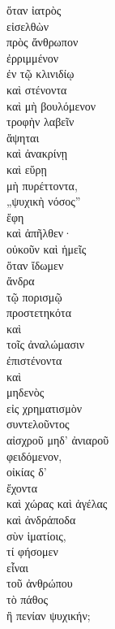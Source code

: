 {\large
\begin{greek}
\noindent  ὅταν ἰατρὸς \\
\tabto{2em} εἰσελθὼν \\
\tabto{4em} πρὸς ἄνθρωπον \\
\tabto{6em} ἐρριμμένον \\
\tabto{8em} ἐν τῷ κλινιδίῳ \\
\tabto{6em} καὶ στένοντα \\
\tabto{6em} καὶ μὴ βουλόμενον \\
\tabto{8em} τροφὴν λαβεῖν \\
ἅψηται \\
καὶ ἀνακρίνῃ \\
καὶ εὕρῃ \\
\tabto{2em} μὴ πυρέττοντα,\\
„ψυχικὴ νόσος”\\
\tabto{2em} ἔφη \\
καὶ ἀπῆλθεν·\\
οὐκοῦν καὶ ἡμεῖς \\
\tabto{2em} ὅταν ἴδωμεν \\
\tabto{4em} ἄνδρα \\
\tabto{6em} τῷ πορισμῷ \\
\tabto{4em} προστετηκότα \\
\tabto{4em} καὶ \\
\tabto{6em} τοῖς ἀναλώμασιν \\
\tabto{4em} ἐπιστένοντα \\

\tabto{4em} καὶ \\
\tabto{6em} μηδενὸς \\
\tabto{8em} εἰς χρηματισμὸν \\
\tabto{6em} συντελοῦντος \\
\tabto{6em} αἰσχροῦ μηδ' ἀνιαροῦ \\
\tabto{4em} φειδόμενον, \\
\tabto{4em} οἰκίας δ' \\
\tabto{6em} ἔχοντα\\
\tabto{4em} καὶ χώρας καὶ ἀγέλας \\
\tabto{4em} καὶ ἀνδράποδα \\
\tabto{6em} σὺν ἱματίοις,\\
τί φήσομεν \\
\tabto{2em} εἶναι \\
\tabto{4em} τοῦ ἀνθρώπου \\
\tabto{2em} τὸ πάθος \\
\tabto{4em} ἢ πενίαν ψυχικήν;\\

\end{greek}
}

